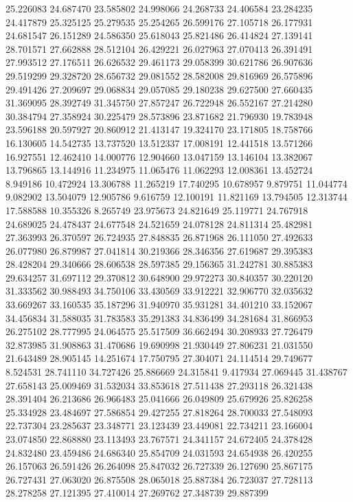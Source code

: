 25.226083
24.687470
23.585802
24.998066
24.268733
24.406584
23.284235
24.417879
25.325125
25.279535
25.254265
26.599176
27.105718
26.177931
24.681547
26.151289
24.586350
25.618043
25.821486
26.414824
27.139141
28.701571
27.662888
28.512104
26.429221
26.027963
27.070413
26.391491
27.993512
27.176511
26.626532
29.461173
29.058399
30.621786
26.907636
29.519299
29.328720
28.656732
29.081552
28.582008
29.816969
26.575896
29.491426
27.209697
29.068834
29.057085
29.180238
29.627500
27.660435
31.369095
28.392749
31.345750
27.857247
26.722948
26.552167
27.214280
30.384794
27.358924
30.225479
28.573896
23.871682
21.796930
19.783948
23.596188
20.597927
20.860912
21.413147
19.324170
23.171805
18.758766
16.130605
14.542735
13.737520
13.512337
17.008191
12.441518
13.571266
16.927551
12.462410
14.000776
12.904660
13.047159
13.146104
13.382067
13.796865
13.144916
11.234975
11.065476
11.062293
12.008361
13.452724
8.949186
10.472924
13.306788
11.265219
17.740295
10.678957
9.879751
11.044774
9.082902
13.504079
12.905786
9.616759
12.100191
11.821169
13.794505
12.313744
17.588588
10.355326
8.265749
23.975673
24.821649
25.119771
24.767918
24.689025
24.478437
24.677548
24.521659
24.078128
24.811314
25.482981
27.363993
26.370597
26.724935
27.848835
26.871968
26.111050
27.492633
26.077980
26.879987
27.041814
30.219366
28.346356
27.619687
29.395383
28.428204
29.340666
28.606538
28.597385
29.156365
31.242781
30.885383
29.634257
31.697112
29.370812
30.648900
29.972273
30.840357
30.220120
31.333562
30.988493
34.750106
33.430569
33.912221
32.906770
32.035632
33.669267
33.160535
35.187296
31.940970
35.931281
34.401210
33.152067
34.456834
31.588035
31.783583
35.291383
34.836499
34.281684
31.866953
26.275102
28.777995
24.064575
25.517509
36.662494
30.208933
27.726479
32.873985
31.908863
31.470686
19.690998
21.930449
27.806231
21.031550
21.643489
28.905145
14.251674
17.750795
27.304071
24.114514
29.749677
8.524531
28.741110
34.727426
25.886669
24.315841
9.417934
27.069445
31.438767
27.658143
25.009469
31.532034
33.853618
27.511438
27.293118
26.321438
28.391404
26.213686
26.966483
25.041666
26.049809
25.679926
25.826258
25.334928
23.484697
27.586854
29.427255
27.818264
28.700033
27.548093
22.737304
23.285637
23.348771
23.123439
23.449081
22.734211
23.166004
23.074850
22.868880
23.113493
23.767571
24.341157
24.672405
24.378428
24.832480
23.459486
24.686340
25.854709
24.031593
24.654938
26.420255
26.157063
26.591426
26.264098
25.847032
26.727339
26.127690
25.867175
26.727431
27.063020
26.875508
28.065018
25.887384
26.723037
27.728113
28.278258
27.121395
27.410014
27.269762
27.348739
29.887399
